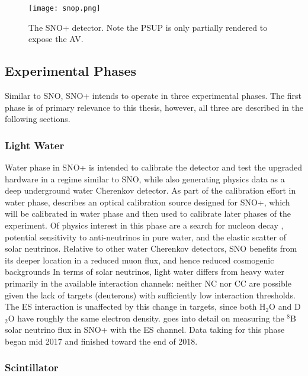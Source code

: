 \begin{figure}
\centering
\texttt{[image: snop.png]}
\caption{\label{fig:snop}The SNO+ detector. Note the PSUP is only partially rendered to expose the AV.}
\end{figure}

\subsection{Experimental Phases}
Similar to SNO, SNO+ intends to operate in three experimental phases.
The first phase is of primary relevance to this thesis, however, all three are described in the following sections.

\subsubsection{Light Water}
Water phase in SNO+ is intended to calibrate the detector and test the upgraded hardware in a regime similar to SNO, while also generating physics data as a deep underground water Cherenkov detector.
As part of the calibration effort in water phase,  describes an optical calibration source designed for SNO+, which will be calibrated in water phase and then used to calibrate later phases of the experiment.
Of physics interest in this phase are a search for nucleon decay \cite{nucleon_decay}, potential sensitivity to anti-neutrinos in pure water, and the elastic scatter of solar neutrinos.
Relative to other water Cherenkov detectors, SNO benefits from its deeper location in a reduced muon flux, and hence reduced cosmogenic backgrounds
In terms of solar neutrinos, light water differs from heavy water primarily in the available interaction channels: neither NC nor CC are possible given the lack of targets (deuterons) with sufficiently low interaction thresholds.
The ES interaction is unaffected by this change in targets, since both H$_2$O and D$_2$O have roughly the same electron density.
 goes into detail on measuring the $^8$B solar neutrino flux in SNO+ with the ES channel.
Data taking for this phase began mid 2017 and finished toward the end of 2018.

\subsubsection{Scintillator}

